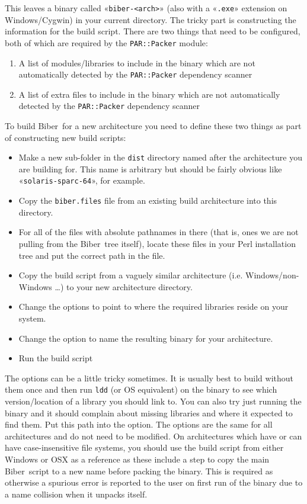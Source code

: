 \documentclass{ltxdockit}
\newcommand*{\biber}{Biber\xspace}
\begin{document}
\noindent This leaves a binary called «\verb+biber-<arch>+» (also with
a «\verb+.exe+» extension on Windows/Cygwin) in your current directory.
The tricky part is constructing the information for the build
script. There are two things that need to be configured, both of
which are required by the \verb+PAR::Packer+ module:

\begin{enumerate}
\item A list of modules/libraries to include in the binary which are not
  automatically detected by the \verb+PAR::Packer+ dependency
  scanner
\item A list of extra files to include in the binary which are not
  automatically detected by the \verb+PAR::Packer+ dependency
  scanner
\end{enumerate}

\noindent To build \biber\ for a new architecture you need to
define these two things as part of constructing new build scripts:

\begin{itemize}
\item Make a new sub-folder in the \verb+dist+ directory named after the
  architecture you are building for. This name is arbitrary but should
  be fairly obvious like «\verb+solaris-sparc-64+», for example.
\item Copy the \verb+biber.files+ file from an existing build
  architecture into this directory.
\item For all of the files with absolute pathnames in there (that is,
  ones we are not pulling from the \biber\ tree itself), locate these
  files in your Perl installation tree and put the correct path in the
  file.
\item Copy the build script from a vaguely similar architecture
  (i.e. Windows/non-Windows \ldots) to your new architecture
  directory. 
\item Change the  options to point to where the required
  libraries reside on your system.
\item Change the  option to name the resulting binary
  for your architecture.
\item Run the build script
\end{itemize}

\noindent The  options can be a little tricky
sometimes. It is usually best to build without them once and then run
\verb+ldd+ (or OS equivalent) on the binary to see which
version/location of a library you should link to. You can also try
just running the binary and it should complain about missing libraries
and where it expected to find them. Put this path into the
 option. The  options are the same for all
architectures and do not need to be modified.
On architectures which have or can have case-insensitive file systems,
you should use the build script from either Windows or OSX as a reference
as these include a step to copy the main \biber\ script to a new name
before packing the binary. This is required as otherwise a spurious
error is reported to the user on first run of the binary due to a name
collision when it unpacks itself.
\end{document}

